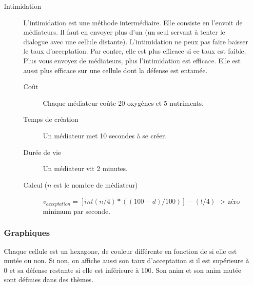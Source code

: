\documentclass{article}
\begin{document}
\begin{description}
	\item[Intimidation]\label{intimi}
		L'intimidation est une méthode intermédiaire. Elle consiste en l'envoit de médiateurs. Il faut en envoyer plus d'un (un seul servant à tenter le dialogue avec une cellule distante). L'intimidation ne peux pas faire baisser le taux d'acceptation. Par contre, elle est plus efficace si ce taux est faible. Plus vous envoyez de médiateurs, plus l'intimidation est efficace. Elle est aussi plus efficace sur une cellule dont la défense est entamée.
		\begin{description}
			\item[Coût] Chaque médiateur coûte 20 oxygènes et 5 nutriments.
			\item[Temps de création] Un médiateur met 10 secondes à se créer.
			\item[Durée de vie] Un médiateur vit 2 minutes.
			\item[Calcul ($n$ est le nombre de médiateur)] $v_{acceptation} = [int(n/4) * ((100-d) / 100)] - (t/4)$ -> zéro minimum par seconde.
		\end{description}
\end{description}

\subsubsection{Graphiques}
Chaque cellule est un hexagone, de couleur différente en fonction de si elle est mutée ou non. Si non, on affiche aussi son taux d'acceptation si il est supérieure à 0 et sa défense restante si elle est inférieure à 100. Son anim et son anim mutée sont définies dans des thèmes.
\end{document}
